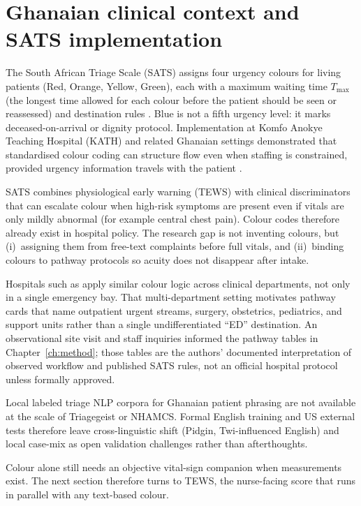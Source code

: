 \section{Ghanaian clinical context and SATS implementation}
\label{sec:ghana-sats}

The South African Triage Scale (SATS) assigns four urgency colours for living patients (Red, Orange, Yellow, Green), each with a maximum waiting time \(T_{\max}\) (the longest time allowed for each colour before the patient should be seen or reassessed) and destination rules \citep{satsmanual}. Blue is not a fifth urgency level: it marks deceased-on-arrival or dignity protocol. Implementation at Komfo Anokye Teaching Hospital (KATH) and related Ghanaian settings demonstrated that standardised colour coding can structure flow even when staffing is constrained, provided urgency information travels with the patient \citep{Rominski2014,kathsats}.

SATS combines physiological early warning (TEWS) with clinical discriminators that can escalate colour when high-risk symptoms are present even if vitals are only mildly abnormal (for example central chest pain). Colour codes therefore already exist in hospital policy. The research gap is not inventing colours, but (i)~assigning them from free-text complaints before full vitals, and (ii)~binding colours to pathway protocols so acuity does not disappear after intake.

Hospitals such as \examplehospital{} apply similar colour logic across clinical departments, not only in a single emergency bay. That multi-department setting motivates pathway cards that name outpatient urgent streams, surgery, obstetrics, pediatrics, and support units rather than a single undifferentiated ``ED'' destination. An observational site visit and staff inquiries informed the pathway tables in Chapter~\ref{ch:method}; those tables are the authors' documented interpretation of observed workflow and published SATS rules, not an official hospital protocol unless formally approved.

Local labeled triage NLP corpora for Ghanaian patient phrasing are not available at the scale of Triagegeist or NHAMCS. Formal English training and US external tests therefore leave cross-linguistic shift (Pidgin, Twi-influenced English) and local case-mix as open validation challenges rather than afterthoughts.

Colour alone still needs an objective vital-sign companion when measurements exist. The next section therefore turns to TEWS, the nurse-facing score that runs in parallel with any text-based colour.


